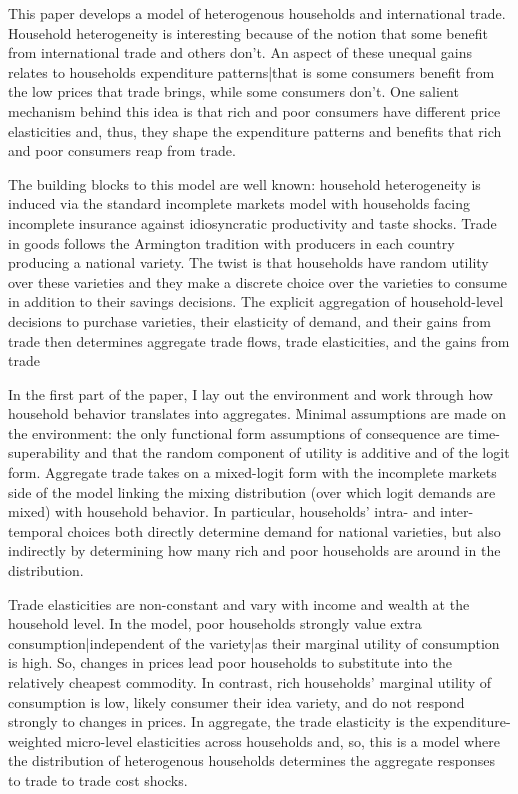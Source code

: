 \documentclass[12pt,pdftex]{article}
\begin{document}
\begin{onehalfspacing}
\hspace{-0.05cm}



\thispagestyle{empty}
\newpage
\normalsize

This paper develops a model of heterogenous households and international trade. Household heterogeneity is interesting because of the notion that some benefit from international trade and others don't. An aspect of these unequal gains relates to households expenditure patterns|that is some consumers benefit from the low prices that trade brings, while some consumers don't. One salient mechanism behind this idea is that rich and poor consumers have different price elasticities and, thus, they shape the expenditure patterns and benefits that rich and poor consumers reap from trade.

The building blocks to this model are well known: household heterogeneity is induced via the standard incomplete markets model with households facing incomplete insurance against idiosyncratic productivity and taste shocks. Trade in goods follows the Armington tradition with producers in each country producing a national variety. The twist is that households have random utility over these varieties and they make a discrete choice over the varieties to consume in addition to their savings decisions. The explicit aggregation of household-level decisions to purchase varieties, their elasticity of demand, and their gains from trade then determines aggregate trade flows, trade elasticities, and the gains from trade

In the first part of the paper, I lay out the environment and work through how household behavior translates into aggregates. Minimal assumptions are made on the environment: the only functional form assumptions of consequence are time-superability and that the random component of utility is additive and of the logit form. Aggregate trade takes on a mixed-logit form with the incomplete markets side of the model linking the mixing distribution (over which logit demands are mixed) with household behavior. In particular, households' intra- and inter-temporal choices both directly determine demand for national varieties, but also indirectly by determining how many rich and poor households are around in the distribution.

Trade elasticities are non-constant and vary with income and wealth at the household level. In the model, poor households strongly value extra consumption|independent of the variety|as their marginal utility of consumption is high. So, changes in prices lead poor households to substitute into the relatively cheapest commodity. In contrast, rich households' marginal utility of consumption is low, likely consumer their idea variety, and do not respond strongly to changes in prices. In aggregate, the trade elasticity is the expenditure-weighted micro-level elasticities across households and, so, this is a model where the distribution of heterogenous households determines the aggregate responses to trade to trade cost shocks.


\end{onehalfspacing}
\end{document}
